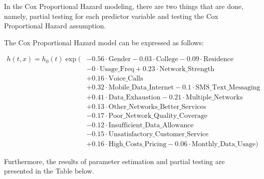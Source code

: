 \documentclass[doublespacing]{report} %
\begin{document}
In the Cox Proportional Hazard modeling, there are two things that are done, namely, partial testing for each predictor variable and testing the Cox Proportional Hazard assumption. 

The Cox Proportional Hazard model can be expressed as follows:


\begin{align*}
h(t,x) = h_0(t) \exp(&-0.56 \cdot \text{Gender} - 0.03 \cdot \text{College} - 0.09 \cdot \text{Residence} \\
&- 0 \cdot \text{Usage\_Freq} + 0.23 \cdot \text{Network\_Strength} \\
&+ 0.16 \cdot \text{Voice\_Calls} \\
&+ 0.32 \cdot \text{Mobile\_Data\_Internet} - 0.1 \cdot \text{SMS\_Text\_Messaging} \\
&+ 0.41 \cdot \text{Data\_Exhaustion} - 0.21 \cdot \text{Multiple\_Networks} \\
&+ 0.13 \cdot \text{Other\_Networks\_Better\_Services} \\
&- 0.17 \cdot \text{Poor\_Network\_Quality\_Coverage} \\
&- 0.12 \cdot \text{Insufficient\_Data\_Allowance} \\
&- 0.15 \cdot \text{Unsatisfactory\_Customer\_Service} \\
&+ 0.16 \cdot \text{High\_Costs\_Pricing} - 0.06 \cdot \text{Monthly\_Data\_Usage})
\end{align*}

 
Furthermore, the results of parameter estimation and partial testing are presented in the Table below.

\end{document}
